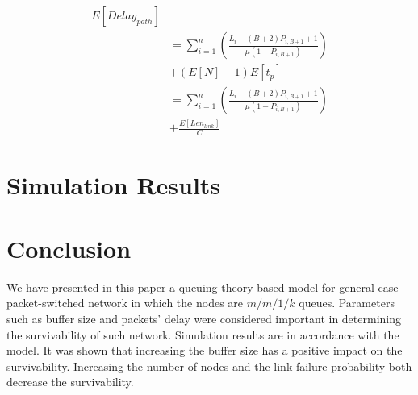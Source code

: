 \documentclass[conference]{IEEEtran}
\begin{document}
    \begin{equation}
        \begin{split}
            E\left[Delay_{path}\right]\\&=\sum_{i=1}^n\left(\frac{L_i-\left(B+2\right)P_{i,B+1}+1}{\mu\left(1-P_{i,B+1}\right)}\right)\\&+\left(E\left[N\right]-1\right)E\left[t_p\right]\\&=\sum_{i=1}^n\left(\frac{L_i-\left(B+2\right)P_{i,B+1}+1}{\mu\left(1-P_{i,B+1}\right)}\right)\\&+\frac{E\left[Len_{link}\right]}{C}
        \end{split}
    \end{equation}

    \section{Simulation Results} \label{sec:simres}

    \section{Conclusion} \label{sec:conc}
    We have presented in this paper a queuing-theory based model for general-case packet-switched network in which the nodes are $m/m/1/k$ queues. Parameters such as buffer size and packets’ delay were considered important in determining the survivability of such network. Simulation results are in accordance with the model. It was shown that increasing the buffer size has a positive impact on the survivability. Increasing the number of nodes and the link failure probability both decrease the survivability.
\end{document}
